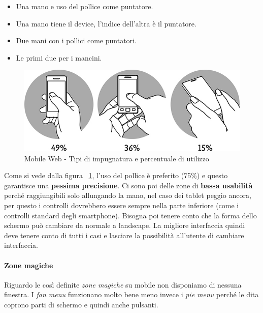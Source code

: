 					\begin{itemize}
						\item Una mano e uso del pollice come puntatore.
						\item Una mano tiene il device, l'indice dell'altra è il puntatore.
						\item Due mani con i pollici come puntatori.
						\item Le primi due per i mancini.
					\end{itemize}
					
					\begin{figure}[h]
						\centering
						\includegraphics[width=\textwidth]{images/MobileWeb-Fitts}	
						\caption[Mobile Web - Impugnature e utilizzo] {Mobile Web - Tipi di impugnatura e percentuale di utilizzo}
						\label{fig:MobileWeb-Fitts}
					\end{figure}
					
					Come si vede dalla figura ~\ref{fig:MobileWeb-Fitts}, l'uso del pollice è preferito (75\%) e questo garantisce una \textbf{pessima precisione}. Ci sono poi delle zone di \textbf{bassa usabilità} perché raggiungibili solo allungando la mano, nel caso dei tablet peggio ancora, per questo i controlli dovrebbero essere sempre nella parte inferiore (come i controlli standard degli smartphone). Bisogna poi tenere conto che la forma dello schermo può cambiare da normale a landscape. La migliore interfaccia quindi deve tenere conto di tutti i casi e lasciare la possibilità all'utente di cambiare interfaccia.
					\paragraph{Zone magiche}
						Riguardo le così definite \emph{zone magiche} su mobile non disponiamo di nessuna finestra. I \emph{fan menu} funzionano molto bene meno invece i \emph{pie menu} perché le dita coprono parti di schermo e quindi anche pulsanti.
					